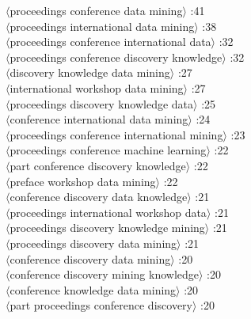 \documentclass[11pt,a4paper,fleqn]{article}
\begin{document}
\begin{multicols}{2} \noindent
$\langle$proceedings conference data mining$\rangle$ :41\\
$\langle$proceedings international data mining$\rangle$ :38\\
$\langle$proceedings conference international data$\rangle$ :32\\
$\langle$proceedings conference discovery knowledge$\rangle$ :32\\
$\langle$discovery knowledge data mining$\rangle$ :27\\
$\langle$international workshop data mining$\rangle$ :27\\
$\langle$proceedings discovery knowledge data$\rangle$ :25\\
$\langle$conference international data mining$\rangle$ :24\\
$\langle$proceedings conference international mining$\rangle$ :23\\
$\langle$proceedings conference machine learning$\rangle$ :22\\
$\langle$part conference discovery knowledge$\rangle$ :22\\
$\langle$preface workshop data mining$\rangle$ :22\\
$\langle$conference discovery data knowledge$\rangle$ :21\\
$\langle$proceedings international workshop data$\rangle$ :21\\
$\langle$proceedings discovery knowledge mining$\rangle$ :21\\
$\langle$proceedings discovery data mining$\rangle$ :21\\
$\langle$conference discovery data mining$\rangle$ :20\\
$\langle$conference discovery mining knowledge$\rangle$ :20\\
$\langle$conference knowledge data mining$\rangle$ :20\\
$\langle$part proceedings conference discovery$\rangle$ :20\\
\end{multicols} \noindent
\end{document}
